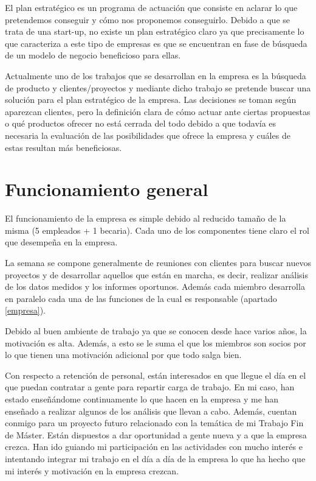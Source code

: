 	El plan estratégico es un programa de actuación que consiste en aclarar lo que pretendemos conseguir y cómo nos proponemos conseguirlo. Debido a que se trata de una start-up, no existe un plan estratégico claro ya que precisamente lo que caracteriza a este tipo de empresas es que se encuentran en fase de búsqueda de un modelo de negocio beneficioso para ellas.
		
		Actualmente uno de los trabajos que se desarrollan en la empresa es la búsqueda de producto y clientes/proyectos y mediante dicho trabajo se pretende buscar una solución para el plan estratégico de la empresa. Las decisiones se toman según aparezcan clientes, pero la definición clara de cómo actuar ante ciertas propuestas o qué productos ofrecer no está cerrada del todo debido a que todavía es necesaria la evaluación de las posibilidades que ofrece la empresa y cuáles de estas resultan más beneficiosas.
		
		
	
	\section{Funcionamiento general}
	
	El funcionamiento de la empresa es simple debido al reducido tamaño de la misma (5 empleados + 1 becaria). Cada uno de los componentes tiene claro el rol que desempeña en la empresa.
	
	La semana se compone generalmente de reuniones con clientes para buscar nuevos proyectos y de desarrollar aquellos que están en marcha, es decir, realizar análisis de los datos medidos y los informes oportunos. Además cada miembro desarrolla en paralelo cada una de las funciones de la cual es responsable (apartado \ref{empresa}).
	
	Debido al buen ambiente de trabajo ya que se conocen desde hace varios años, la motivación es alta. Además, a esto se le suma el que los miembros son socios por lo que tienen una motivación adicional por que todo salga bien. 
	
	Con respecto a retención de personal, están interesados en que llegue el día en el que puedan contratar a gente para repartir carga de trabajo. En mi caso, han estado enseñándome continuamente lo que hacen en la empresa y me han enseñado a realizar algunos de los análisis que llevan a cabo. Además, cuentan conmigo para un proyecto futuro relacionado con la temática de mi Trabajo Fin de Máster. Están dispuestos a dar oportunidad a gente nueva y a que la empresa crezca. Han ido guiando mi participación en las actividades con mucho interés e intentando integrar mi trabajo en el día a día de la empresa lo que ha hecho que mi interés y motivación en la empresa crezcan.
	
	